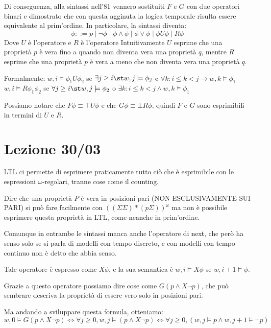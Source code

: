 Di conseguenza, alla sintassi nell'81 vennero sostituiti \(F\) e \(G\) con due operatori binari e dimostrato che con questa agginuta la logica temporale risulta essere equivalente al prim'ordine.
In particolare, la sintassi diventa:
\[\phi ::= p \mid \neg \phi \mid \phi \land \phi \mid \phi \lor \phi \mid \phi U \phi \mid R\phi\]
Dove \(U\) è l'operatore  e \(R\) è l'operatore 
Intuitivamente \(U\) esprime che una proprietà \(p\) è vera fino a quando non diventa vera una proprietà \(q\), mentre \(R\) esprime che una proprietà \(p\) è vera a meno che non diventa vera una proprietà \(q\).

Formalmente:
\(w,i \models \phi_1 U \phi_2\) se \(\exists j \geq i \st w,j\models \phi_2\) e \(\forall k: i \leq k < j \to w,k\models \phi_1\)
\(w,i \models R\phi_1 \phi_2\) se \(\forall j \geq i \st w,j\models \phi_2\) o \(\exists k: i \leq k < j \land w,k\models \phi_1\)

Possiamo notare che \(F\phi \equiv \top U \phi\) e che \(G\phi \equiv \bot R \phi\), quindi \(F\) e \(G\) sono esprimibili in termini di \(U\) e \(R\).

\chapter{Lezione 30/03}

LTL ci permette di esprimere praticamente tutto ciò che è esprimibile con le espressioni \(\omega\)-regolari, tranne cose come il counting.

Dire che una proprietà \(P\) è vera in posizioni pari (NON ESCLUSIVAMENTE SUI PARI) si può fare facilmente con \({((\Sigma\Sigma)*(p\Sigma))}^\omega\) ma non è possibile esprimere questa proprietà in LTL, come neanche in prim'ordine.

Comunque in entrambe le sintassi manca anche l'operatore di next, che però ha senso solo se si parla di modelli con tempo discreto, e con modelli con tempo continuo non è detto che abbia senso.

Tale operatore è espresso come \(X \phi\), e la sua semantica è \(w,i \models X\phi\) se \(w,i+1 \models \phi\).

Grazie a questo operatore possiamo dire cose come \(G(p\land X \neg p)\), che può sembrare descriva la proprietà di essere vero solo in posizioni pari.

Ma andando a sviluppare questa formula, otteniamo:
\[w,0\models G(p\land X \neg p) \iff \forall j \geq 0, w,j \models (p\land X \neg p) \iff \forall j \geq 0, (w,j \models p \land w,j+1 \models \neg p)\]

